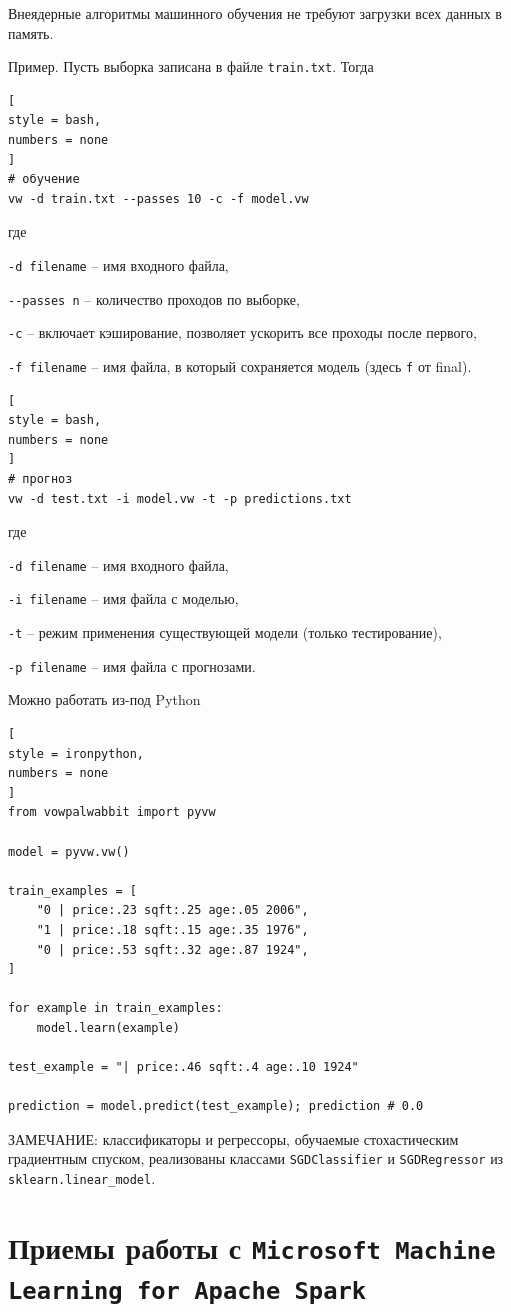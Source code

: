 \documentclass[%
	11pt,
	a4paper,
	utf8,
		]{article}
\begin{document}
Внеядерные алгоритмы машинного обучения не требуют загрузки всех данных в память.

Пример. Пусть выборка записана в файле \texttt{train.txt}. Тогда
\begin{lstlisting}[
style = bash,
numbers = none
]
# обучение
vw -d train.txt --passes 10 -c -f model.vw
\end{lstlisting}
где

\texttt{-d filename} -- имя входного файла,

\verb|--passes n| -- количество проходов по выборке,

\verb|-c| -- включает кэширование, позволяет ускорить все проходы после первого,

\verb|-f filename| -- имя файла, в который сохраняется модель (здесь \texttt{f} от final).

\begin{lstlisting}[
style = bash,
numbers = none
]
# прогноз
vw -d test.txt -i model.vw -t -p predictions.txt
\end{lstlisting}
где

\texttt{-d filename} -- имя входного файла,

\texttt{-i filename} -- имя файла с моделью,

\texttt{-t} -- режим применения существующей модели (только тестирование),

\texttt{-p filename} -- имя файла с прогнозами.

Можно работать из-под Python
\begin{lstlisting}[
style = ironpython,
numbers = none
]
from vowpalwabbit import pyvw

model = pyvw.vw()

train_examples = [
    "0 | price:.23 sqft:.25 age:.05 2006",
    "1 | price:.18 sqft:.15 age:.35 1976",
    "0 | price:.53 sqft:.32 age:.87 1924",
]

for example in train_examples:
    model.learn(example)
    
test_example = "| price:.46 sqft:.4 age:.10 1924"

prediction = model.predict(test_example); prediction # 0.0
\end{lstlisting}

ЗАМЕЧАНИЕ: классификаторы и регрессоры, обучаемые стохастическим градиентным спуском, реализованы классами \texttt{SGDClassifier} и \texttt{SGDRegressor} из \texttt{sklearn.linear\_model}.




\section{Приемы работы с \texttt{Microsoft Machine Learning for Apache Spark}}
\end{document}
